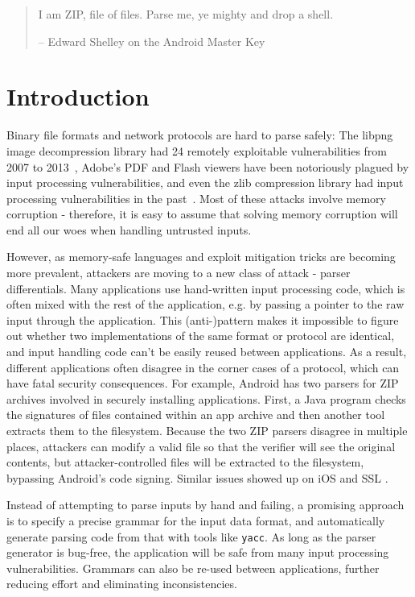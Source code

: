 \begin{quote}
  I am ZIP, file of files.
  Parse me, ye mighty and drop a shell.

  -- Edward Shelley on the Android Master Key
\end{quote}
\section{Introduction}
Binary file formats and network protocols are hard to parse safely: 
The libpng image decompression library had 24 remotely
exploitable vulnerabilities from 2007 to 2013~\cite{cvedetails:libpng},
Adobe's PDF and Flash viewers have been notoriously plagued by input
processing vulnerabilities, and even the zlib compression library had
input processing vulnerabilities in the past~\cite{cvedetails:zlib}.
Most of these attacks involve memory corruption - therefore, it is easy to assume that 
solving memory corruption will end all our woes when handling untrusted inputs. 

However, as memory-safe languages and exploit mitigation  tricks are becoming more prevalent,
attackers are moving to a new class of attack - parser differentials. Many applications use
hand-written input processing code, which is often mixed with the rest of the application, e.g. by
passing a pointer to the raw input through the application. This (anti-)pattern makes it impossible
to figure out whether two implementations of the same format or protocol are identical, and input
handling code can't be easily reused between applications. As a result, different applications often
disagree in the corner cases of a protocol, which can have fatal security consequences. For example,
Android has two parsers for ZIP archives involved in securely installing applications. First, a Java
program checks the signatures of files contained within an app archive and then another tool
extracts them to the filesystem. Because the two ZIP parsers disagree in multiple places, attackers
can modify a valid file so that the verifier will see the original contents, but attacker-controlled
files will be extracted to the filesystem, bypassing Android's code signing. Similar issues showed
up on iOS \cite{geohot-evasion} and SSL \cite{DBLP:conf/fc/KaminskyPS10}. 

Instead of attempting to parse inputs by hand and failing, 
a promising approach is to specify
a precise grammar for the input data format, and automatically generate parsing code from that with tools like {\tt yacc}. As long
as the parser generator is bug-free, the application will be safe from many
input processing vulnerabilities. Grammars can also be re-used between
applications, further reducing effort and eliminating inconsistencies.

